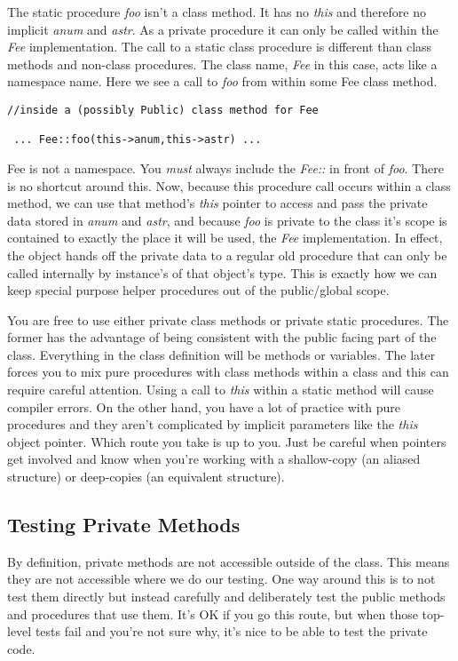 \documentclass[10pt]{article}
\begin{document}
The static procedure \textit{foo} isn't a class method. It has no \textit{this} and therefore no implicit \textit{anum} and \textit{astr}.  As a private procedure it can only be called within the \textit{Fee} implementation. The call to a static class procedure is different than class methods and non-class procedures. The class name, \textit{Fee} in this case, acts like a namespace name. Here we see a call to \textit{foo} from within some Fee class method.
\begin{verbatim}
//inside a (possibly Public) class method for Fee

 ... Fee::foo(this->anum,this->astr) ...
\end{verbatim}
Fee is not a namespace. You \textit{must} always include the \textit{Fee::} in front of \textit{foo}. There is no shortcut around this. Now, because this procedure call occurs within a class method, we can use that method's \textit{this} pointer to access and pass the private data stored in \textit{anum} and \textit{astr}, and because \textit{foo} is private to the class it's scope is contained to exactly the place it will be used, the \textit{Fee} implementation. In effect, the object hands off the private data to a regular old procedure that can only be called internally by instance's of that object's type. This is exactly how we can keep special purpose helper procedures out of the public/global scope.

You are free to use either private class methods or private static procedures. The former has the advantage of being consistent with the public facing part of the class. Everything in the class definition will be methods or variables. The later forces you to mix pure procedures with class methods within a class and this can require careful attention. Using a call to \textit{this} within a static method will cause compiler errors. On the other hand, you have a lot of practice with pure procedures and they aren't complicated by implicit parameters like the \textit{this} object pointer. Which route you take is up to you. Just be careful when pointers get involved and know when you're working with a shallow-copy (an aliased structure) or deep-copies (an equivalent structure).

\subsection*{Testing Private Methods}

By definition, private methods are not accessible outside of the class. This means they are not accessible where we do our testing. One way around this is to not test them directly but instead carefully and deliberately test the public methods and procedures that use them. It's OK if you go this route, but when those top-level tests fail and you're not sure why, it's nice to be able to test the private code.
\end{document}
